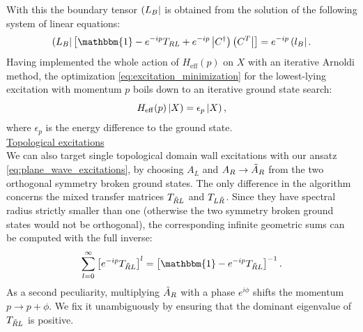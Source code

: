 With this the boundary tensor $\left( L_B \right|$ is obtained from the solution of the following system of linear equations:
\begin{equation}
	\tbra{L_B} \left[ \mathbbm{1} - e^{-ip} T_{RL} + e^{-ip} \tket{C^{\dagger}}\tbra{C^T} \right] = e^{-ip} \tbra{l_B}.
\end{equation}
\noindent Having implemented the whole action of $H_{\mathrm{eff}}(p)$ on $X$ with an iterative Arnoldi method, the optimization \eqref{eq:excitation_minimization} for the lowest-lying excitation with momentum $p$ boils down to an iterative ground state search:
\begin{equation} \label{eq:ground_state_H_eff_p}
	H_{\mathrm{eff}}(p) \left| X \right) = \epsilon_p \left| X \right),
\end{equation}
where $\epsilon_p$ is the energy difference to the ground state. \\[1em]

\noindent \underline{Topological excitations} \\[0.5em]
\noindent We can also target single topological domain wall excitations with our ansatz \eqref{eq:plane_wave_excitations}, by choosing $A_L$ and $A_R \rightarrow \Tilde{A}_R$ from the two orthogonal symmetry broken ground states. The only difference in the algorithm concerns the mixed transfer matrices $T_{\Tilde{R}L}$ and $T_{L\Tilde{R}}$. Since they have spectral radius strictly smaller than one (otherwise the two symmetry broken ground states would not be orthogonal), the corresponding infinite geometric sums can be computed with the full inverse:
\begin{equation}
	\sum_{l=0}^{\infty} \left[ e^{-ip} T_{\Tilde{R}L} \right]^l  = \left[ \mathbbm{1} - e^{-ip} T_{\Tilde{R}L} \right]^{-1}.
\end{equation}
As a second peculiarity, multiplying $\Tilde{A}_R$ with a phase $e^{i \phi}$ shifts the momentum $p \rightarrow p + \phi$. We fix it unambiguously by ensuring that the dominant eigenvalue of $T_{\Tilde{R}L}$ is positive. \cite{vanderstraeten2019tangent} \\[1em]

